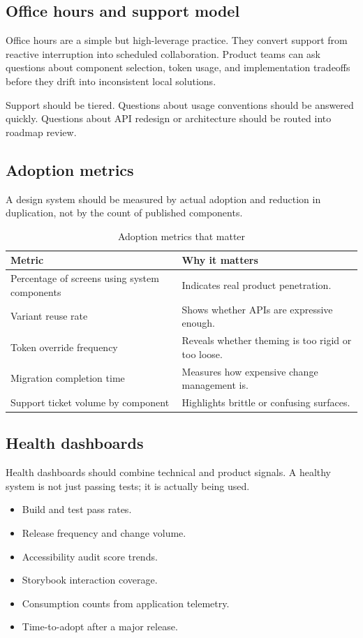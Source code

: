 \subsection{Office hours and support model}
Office hours are a simple but high-leverage practice. They convert support from reactive interruption into scheduled collaboration. Product teams can ask questions about component selection, token usage, and implementation tradeoffs before they drift into inconsistent local solutions.

Support should be tiered. Questions about usage conventions should be answered quickly. Questions about API redesign or architecture should be routed into roadmap review.

\subsection{Adoption metrics}
A design system should be measured by actual adoption and reduction in duplication, not by the count of published components.

\begin{table}[htbp]
  \centering
  \caption{Adoption metrics that matter}
  \begin{tabularx}{\textwidth}{@{}p{}X@{}}
    \toprule
    \textbf{Metric} & \textbf{Why it matters} \\
    \midrule
    Percentage of screens using system components & Indicates real product penetration. \\
    Variant reuse rate & Shows whether APIs are expressive enough. \\
    Token override frequency & Reveals whether theming is too rigid or too loose. \\
    Migration completion time & Measures how expensive change management is. \\
    Support ticket volume by component & Highlights brittle or confusing surfaces. \\
    \bottomrule
  \end{tabularx}
\end{table}

\subsection{Health dashboards}
Health dashboards should combine technical and product signals. A healthy system is not just passing tests; it is actually being used.

\begin{itemize}[leftmargin=*, itemsep=0.35em]
  \item Build and test pass rates.
  \item Release frequency and change volume.
  \item Accessibility audit score trends.
  \item Storybook interaction coverage.
  \item Consumption counts from application telemetry.
  \item Time-to-adopt after a major release.
\end{itemize}


